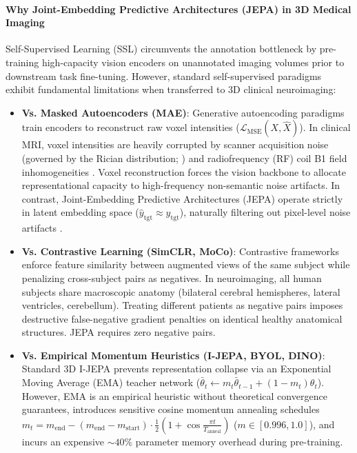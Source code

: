 \documentclass{article}
\begin{document}
\paragraph{Why Joint-Embedding Predictive Architectures (JEPA) in 3D Medical Imaging}
Self-Supervised Learning (SSL) circumvents the annotation bottleneck by pre-training high-capacity vision encoders on unannotated imaging volumes prior to downstream task fine-tuning. However, standard self-supervised paradigms exhibit fundamental limitations when transferred to 3D clinical neuroimaging:
\begin{itemize}
    \item \textbf{Vs. Masked Autoencoders (MAE)}: Generative autoencoding paradigms \citep{he2022masked,feichtenhofer2022masked} train encoders to reconstruct raw voxel intensities ($\mathcal{L}_{\text{MSE}}(X, \hat{X})$). In clinical MRI, voxel intensities are heavily corrupted by scanner acquisition noise (governed by the Rician distribution; \citet{gudbjartsson1995rician}) and radiofrequency (RF) coil B1 field inhomogeneities \citep{sled1998nonparametric}. Voxel reconstruction forces the vision backbone to allocate representational capacity to high-frequency non-semantic noise artifacts. In contrast, Joint-Embedding Predictive Architectures (JEPA) \citep{assran2023ijepa} operate strictly in latent embedding space ($\hat{y}_{\text{tgt}} \approx y_{\text{tgt}}$), naturally filtering out pixel-level noise artifacts \citep{balestriero2025lejepa}.
    \item \textbf{Vs. Contrastive Learning (SimCLR, MoCo)}: Contrastive frameworks enforce feature similarity between augmented views of the same subject while penalizing cross-subject pairs as negatives. In neuroimaging, all human subjects share macroscopic anatomy (bilateral cerebral hemispheres, lateral ventricles, cerebellum). Treating different patients as negative pairs imposes destructive false-negative gradient penalties on identical healthy anatomical structures. JEPA requires zero negative pairs.
    \item \textbf{Vs. Empirical Momentum Heuristics (I-JEPA, BYOL, DINO)}: Standard 3D I-JEPA \citep{assran2023ijepa} prevents representation collapse via an Exponential Moving Average (EMA) teacher network ($\bar{\theta}_t \leftarrow m_t \bar{\theta}_{t-1} + (1-m_t) \theta_t$). However, EMA is an empirical heuristic without theoretical convergence guarantees, introduces sensitive cosine momentum annealing schedules $m_t = m_{\text{end}} - (m_{\text{end}} - m_{\text{start}}) \cdot \frac{1}{2}\left(1 + \cos\frac{\pi t}{T_{\text{anneal}}}\right)$ ($m \in [0.996, 1.0]$), and incurs an expensive $\sim 40\%$ parameter memory overhead during pre-training.
\end{itemize}
\end{document}
